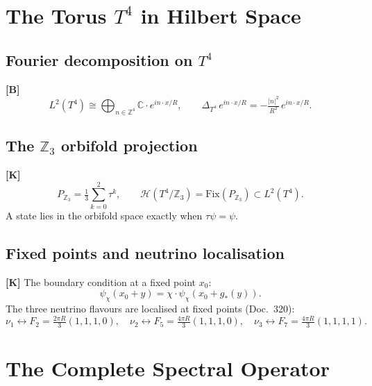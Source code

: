 \section{The Torus $T^4$ in Hilbert Space}

\subsection{Fourier decomposition on $T^4$}

\textbf{[B]}
\begin{equation}
  L^2(T^4) \cong \bigoplus_{n\in\mathbb{Z}^4}
  \mathbb{C}\cdot e^{in\cdot x/R},\qquad
  \Delta_{T^4}\,e^{in\cdot x/R} = -\tfrac{|n|^2}{R^2}\,e^{in\cdot x/R}.
\end{equation}

\subsection{The $\mathbb{Z}_3$ orbifold projection}

\textbf{[K]}
\begin{equation}
  P_{\mathbb{Z}_3} = \tfrac{1}{3}\sum_{k=0}^2 \tau^k,
  \qquad
  \mathcal{H}(T^4/\mathbb{Z}_3) = \mathrm{Fix}(P_{\mathbb{Z}_3})
  \subset L^2(T^4).
\end{equation}
A state lies in the orbifold space exactly when $\tau\psi = \psi$.

\subsection{Fixed points and neutrino localisation}

\textbf{[K]} The boundary condition at a fixed point $x_0$:
\begin{equation}
  \psi_\chi(x_0 + y) = \chi\cdot\psi_\chi(x_0 + g_*(y)).
  \label{eq:rbd}
\end{equation}
The three neutrino flavours are localised at fixed points
(Doc.~320):
\begin{equation}
  \nu_1 \leftrightarrow F_2 = \tfrac{2\pi R}{3}(1,1,1,0),\quad
  \nu_2 \leftrightarrow F_5 = \tfrac{4\pi R}{3}(1,1,1,0),\quad
  \nu_3 \leftrightarrow F_7 = \tfrac{4\pi R}{3}(1,1,1,1).
\end{equation}

\section{The Complete Spectral Operator}

